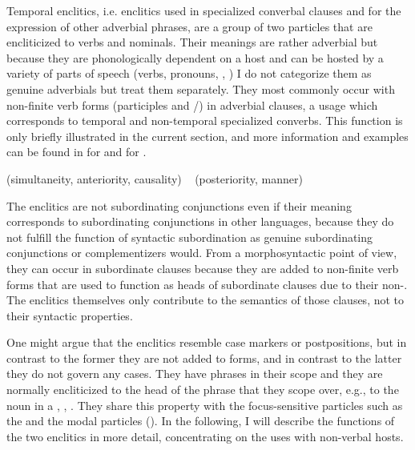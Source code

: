 Temporal enclitics, i.e. enclitics used in specialized converbal clauses and for the expression of other adverbial phrases, are a group of two particles that are encliticized to verbs and nominals. Their meanings are rather adverbial  but because they are phonologically dependent on a host and can be hosted by a variety of parts of speech (verbs, pronouns, , ) I do not categorize them as genuine adverbials but treat them separately. They most commonly occur with non-finite verb forms (participles and /) in adverbial clauses, a usage which corresponds to temporal and non-temporal specialized converbs. This function is only briefly illustrated in the current section, and more information and examples can be found in  for  and  for . 


\begin{exe}
	\ex	\label{ex:subordinating enclitics}
	\begin{xlist}
		\TabPositions{14em}
		\ex	{} 	\tab	(simultaneity, anteriority, causality)	   
		\ex	{} 
		\sn	~\hspace*{1em}					\tab	(posteriority, manner)	      
	\end{xlist}
\end{exe}

The enclitics are not subordinating conjunctions even if their meaning corresponds to subordinating conjunctions in other languages, because they do not fulfill the function of syntactic subordination as genuine subordinating conjunctions or complementizers would. From a morphosyntactic point of view, they can occur in subordinate clauses because they are added to non-finite verb forms that are used to function as heads of subordinate clauses due to their non-. The enclitics themselves only contribute to the semantics of those clauses, not to their syntactic properties. 

One might argue that the enclitics resemble case markers or postpositions, but in contrast to the former they are not added to  forms, and in contrast to the latter they do not govern any cases. They have phrases in their scope and they are normally encliticized to the head of the phrase that they scope over, e.g., to the noun in a  , , . They share this property with the focus-sensitive particles such as the  and the modal particles (). In the following, I will describe the functions of the two enclitics in more detail, concentrating on the uses with non-verbal hosts.

